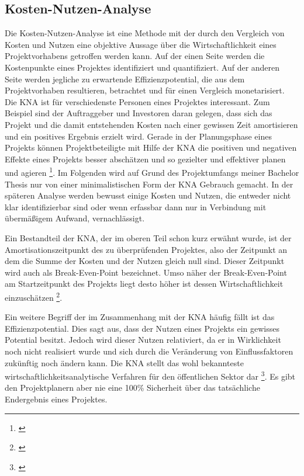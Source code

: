 \subsection{Kosten-Nutzen-Analyse}
Die Kosten-Nutzen-Analyse ist eine Methode mit der durch den Vergleich von Kosten und Nutzen eine objektive Aussage über die Wirtschaftlichkeit eines Projektvorhabens getroffen werden kann. Auf der einen Seite werden die Kostenpunkte eines Projektes identifiziert und quantifiziert. Auf der anderen Seite werden jegliche zu erwartende Effizienzpotential, die aus dem Projektvorhaben resultieren, betrachtet und für einen Vergleich monetarisiert. Die \gls{KNA} ist für verschiedenste Personen eines Projektes interessant. Zum Beispiel sind der Auftraggeber und Investoren daran gelegen, dass sich das Projekt und die damit entstehenden Kosten nach einer gewissen Zeit amortisieren und ein positives Ergebnis erzielt wird. Gerade in der Planungsphase eines Projekts können Projektbeteiligte mit Hilfe der \gls{KNA} die positiven und negativen Effekte eines Projekts besser abschätzen und so gezielter und effektiver planen und agieren \footnote{\cite[vgl.][]{Hanusch2011}}. Im Folgenden wird auf Grund des Projektumfangs meiner Bachelor Thesis nur von einer minimalistischen Form der \gls{KNA} Gebrauch gemacht. In der späteren Analyse werden bewusst einige Kosten und Nutzen, die entweder nicht klar identifizierbar sind oder wenn erfassbar dann nur in Verbindung mit übermäßigem Aufwand, vernachlässigt. 

Ein Bestandteil der \gls{KNA}, der im oberen Teil schon kurz erwähnt wurde, ist der Amortisationszeitpunkt des zu überprüfenden Projektes, also der Zeitpunkt an dem die Summe der Kosten und der Nutzen gleich null sind. Dieser Zeitpunkt wird auch als Break-Even-Point bezeichnet. Umso näher der Break-Even-Point am Startzeitpunkt des Projekts liegt desto höher ist dessen Wirtschaftlichkeit einzuschätzen \footnote{\cite[vgl.][]{Hanusch2011}}.

Ein weitere Begriff der im Zusammenhang mit der \gls{KNA} häufig fällt ist das Effizienzpotential. Dies sagt aus, dass der Nutzen eines Projekts ein gewisses Potential besitzt. Jedoch wird dieser Nutzen relativiert, da er in Wirklichkeit noch nicht realisiert wurde und sich durch die Veränderung von Einflussfaktoren zukünftig noch ändern kann. Die \gls{KNA} \glqq [...] stellt das wohl bekannteste wirtschaftlichkeitsanalytische Verfahren für den öffentlichen Sektor dar\grqq{} \footnote{\cite[vgl.][1]{Hanusch2011}}. Es gibt den Projektplanern aber nie eine 100\% Sicherheit über das tatsächliche Endergebnis eines Projektes.

